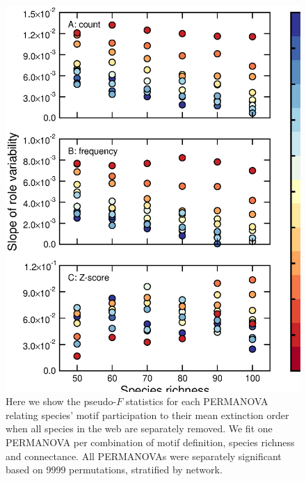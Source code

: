 \documentclass[12pt]{article}
\begin{document}
\begin{spacing}{2.0}
		\begin{figure}[h!]
			\caption{Here we show the pseudo-$F$ statistics for each PERMANOVA relating species' motif participation to their mean extinction order when all species in the web are separately removed. We fit one PERMANOVA per combination of motif definition, species richness and connectance. All PERMANOVAs were separately significant based on 9999 permutations, stratified by network. }
			\label{fig:dispfig}
			\includegraphics[height=.65\textheight]{figures/dispersion_lms.eps}
			\end{figure}
        


\end{spacing}
\end{document}
